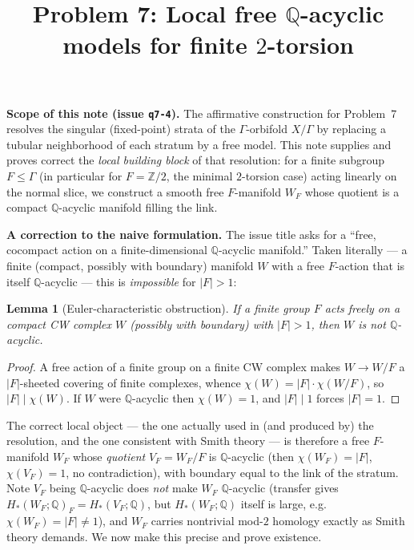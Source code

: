 \documentclass[12pt]{article}
\title{Problem 7: Local free $\mathbb{Q}$-acyclic models for finite $2$-torsion}
\author{}
\date{}
\newtheorem{lemma}[theorem]{Lemma}
\theoremstyle{definition}
\begin{document}
\maketitle

\noindent\textbf{Scope of this note (issue \texttt{q7-4}).}
The affirmative construction for Problem~7 resolves the singular (fixed-point)
strata of the $\Gamma$-orbifold $X/\Gamma$ by replacing a tubular neighborhood
of each stratum by a free model. This note supplies and proves correct the
\emph{local building block} of that resolution: for a finite subgroup
$F\le\Gamma$ (in particular for $F=\mathbb{Z}/2$, the minimal $2$-torsion case)
acting linearly on the normal slice, we construct a smooth free $F$-manifold
$W_F$ whose quotient is a compact $\mathbb{Q}$-acyclic manifold filling the
link.

\medskip
\noindent\textbf{A correction to the naive formulation.}
The issue title asks for a ``free, cocompact action on a finite-dimensional
$\mathbb{Q}$-acyclic manifold.'' Taken literally --- a finite (compact, possibly
with boundary) manifold $W$ with a free $F$-action that is itself
$\mathbb{Q}$-acyclic --- this is \emph{impossible} for $|F|>1$:

\begin{lemma}[Euler-characteristic obstruction]\label{lem:euler}
If a finite group $F$ acts freely on a compact CW complex $W$ (possibly with
boundary) with $|F|>1$, then $W$ is not $\mathbb{Q}$-acyclic.
\end{lemma}
\begin{proof}
A free action of a finite group on a finite CW complex makes $W\to W/F$ a
$|F|$-sheeted covering of finite complexes, whence
$\chi(W)=|F|\cdot\chi(W/F)$, so $|F|\mid\chi(W)$. If $W$ were
$\mathbb{Q}$-acyclic then $\chi(W)=1$, and $|F|\mid 1$ forces $|F|=1$.
\end{proof}

The correct local object --- the one actually used in (and produced by) the
resolution, and the one consistent with Smith theory --- is therefore a free
$F$-manifold $W_F$ whose \emph{quotient} $V_F=W_F/F$ is $\mathbb{Q}$-acyclic
(then $\chi(W_F)=|F|$, $\chi(V_F)=1$, no contradiction), with boundary equal to
the link of the stratum. Note $V_F$ being $\mathbb{Q}$-acyclic does \emph{not}
make $W_F$ $\mathbb{Q}$-acyclic (transfer gives $H_*(W_F;\mathbb{Q})_F=
H_*(V_F;\mathbb{Q})$, but $H_*(W_F;\mathbb{Q})$ itself is large, e.g.\
$\chi(W_F)=|F|\neq1$), and $W_F$ carries nontrivial mod-$2$ homology exactly as
Smith theory demands. We now make this precise and prove existence.
\end{document}
